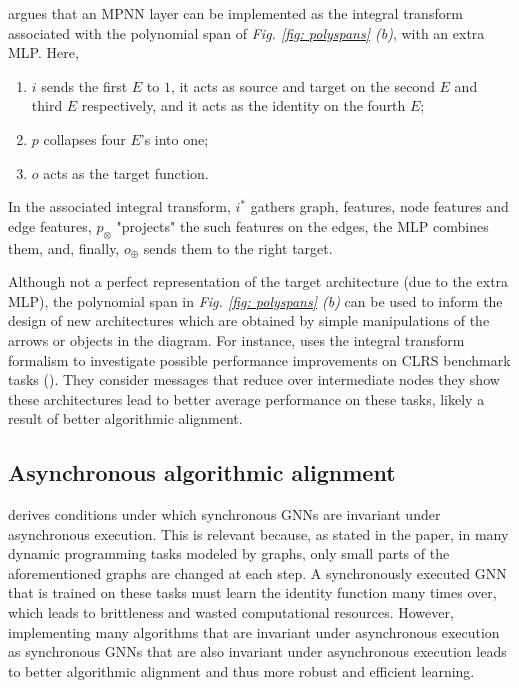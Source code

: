 \documentclass[11pt,a4paper,openright,twoside]{report}
\theoremstyle{plain}
\theoremstyle{definition}
\begin{document}
\cite{dudzik2022graph} argues that an MPNN layer can be implemented as the integral transform associated with the polynomial span of \textit{Fig. \ref{fig: polyspans} (b)}, with an extra MLP. Here,
\begin{enumerate}
  \item $i$ sends the first $E$ to $1$, it acts as source and target on the second $E$ and third $E$ respectively, and it acts as the identity on the fourth $E$;
  \item $p$ collapses four $E$'s into one;
  \item $o$ acts as the target function.
\end{enumerate}
In the associated integral transform, $i^*$ gathers graph, features, node features and edge features, $p_{\otimes}$ "projects" the such features on the edges, the MLP combines them, and, finally, $o_{\oplus}$ sends them to the right target.


Although not a perfect representation of the target architecture (due to the extra MLP), the polynomial span in \textit{Fig. \ref{fig: polyspans} (b)} can be used to inform the design of new architectures which are obtained by simple manipulations of the arrows or objects in the diagram. For instance, \cite{dudzik2022graph} uses the integral transform formalism to investigate possible performance improvements on CLRS benchmark tasks (\cite{velivckovic2022clrs}). They consider messages that reduce over intermediate nodes they show these architectures lead to better average performance on these tasks, likely a result of better algorithmic alignment.


\subsection{Asynchronous algorithmic alignment}

\cite{dudzik2024asynchronous} derives conditions under which synchronous GNNs are invariant under asynchronous execution. This is relevant because, as stated in the paper, in many dynamic programming tasks modeled by graphs, only small parts of the aforementioned graphs are changed at each step. A synchronously executed GNN that is trained on these tasks must learn the identity function many times over, which leads to brittleness and wasted computational resources. However, implementing many algorithms that are invariant under asynchronous execution as synchronous GNNs that are also invariant under asynchronous execution leads to better algorithmic alignment and thus more robust and efficient learning.
\end{document}
